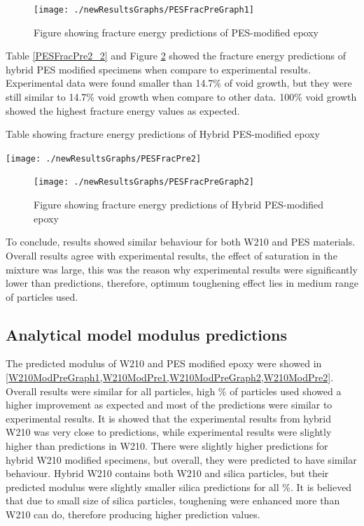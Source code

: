 \documentclass[numbers=noendperiod,chapterprefix=on]{icldt} %
\begin{document}
\begin{figure}[!hp]
\centering
\texttt{[image: ./newResultsGraphs/PESFracPreGraph1]}
\caption{Figure showing fracture energy predictions of PES-modified epoxy}
\label{PESFracPre2}
\end{figure}
\FloatBarrier
Table \ref{PESFracPre2_2} and Figure \ref{PESFracPreGraph2} showed the fracture energy predictions of hybrid PES modified specimens when compare to experimental results. Experimental data were found smaller than 14.7\% of void growth, but they were still similar to 14.7\% void growth when compare to other data. 100\% void growth showed the highest fracture energy values as expected.

\begin{table}[!htpb]
\centering
\caption{Table showing fracture energy predictions of Hybrid PES-modified epoxy} \label{PESFracPre2_2}
\texttt{[image: ./newResultsGraphs/PESFracPre2]}
\end{table}
\FloatBarrier
\begin{figure}[!btp]
\centering
\texttt{[image: ./newResultsGraphs/PESFracPreGraph2]}
\label{PESFracPreGraph2}
\caption{Figure showing fracture energy predictions of Hybrid PES-modified epoxy}
\end{figure}

To conclude, results showed similar behaviour for both W210 and PES materials. Overall results agree with experimental results, the effect of saturation in the mixture was large, this was the reason why experimental results were significantly lower than predictions, therefore, optimum toughening effect lies in medium range of particles used. 

\subsection{Analytical model modulus predictions}
The predicted modulus of W210 and PES modified epoxy were showed in \ref{W210ModPreGraph1,W210ModPre1,W210ModPreGraph2,W210ModPre2}. Overall results were similar for all particles, high \% of particles used showed a higher improvement as expected and most of the predictions were similar to experimental results. 
It is showed that the experimental results from hybrid W210 was very close to predictions, while experimental results were slightly higher than predictions in W210. There were slightly higher predictions for hybrid W210 modified specimens, but overall, they were predicted to have similar behaviour. Hybrid W210 contains both W210 and silica particles, but their predicted modulus were slightly smaller silica predictions for all \%. It is believed that due to small size of silica particles, toughening were enhanced more than W210 can do, therefore producing higher prediction values.
\end{document}
